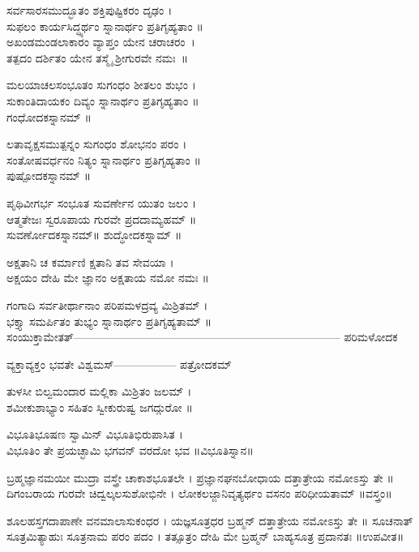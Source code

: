ಸರ್ವಸಾರಸಮುದ್ಭೂತಂ ಶಕ್ತಿಪುಷ್ಟಿಕರಂ ದೃಢಂ ।\\
ಸುಫಲಂ ಕಾರ್ಯಸಿದ್ಧ್ಯರ್ಥಂ ಸ್ನಾನಾರ್ಥಂ ಪ್ರತಿಗೃಹ್ಯತಾಂ ॥\\
ಅಖಂಡಮಂಡಲಾಕಾರಂ ವ್ಯಾಪ್ತಂ ಯೇನ ಚರಾಚರಂ~।\\
ತತ್ಪದಂ ದರ್ಶಿತಂ ಯೇನ ತಸ್ಮೈ ಶ್ರೀಗುರವೇ ನಮಃ~॥

ಮಲಯಾಚಲಸಂಭೂತಂ ಸುಗಂಧಂ ಶೀತಲಂ ಶುಭಂ ।\\
ಸುಕಾಂತಿದಾಯಕಂ ದಿವ್ಯಂ ಸ್ನಾನಾರ್ಥಂ ಪ್ರತಿಗೃಹ್ಯತಾಂ ॥\\
 ಗಂಧೋದಕಸ್ನಾನಮ್ ॥

ಲತಾವೃಕ್ಷಸಮುತ್ಪನ್ನಂ ಸುಗಂಧಂ ಶೋಭನಂ ಪರಂ ।\\
ಸಂತೋಷವರ್ಧನಂ ನಿತ್ಯಂ ಸ್ನಾನಾರ್ಥಂ ಪ್ರತಿಗೃಹ್ಯತಾಂ ॥ \\
ಪುಷ್ಪೋದಕಸ್ನಾನಮ್ ॥

ಪೃಥಿವೀಗರ್ಭ ಸಂಭೂತ ಸುವರ್ಣೇನ ಯುತಂ ಜಲಂ ।\\
ಆತ್ಮತೇಜಃ ಸ್ವರೂಪಾಯ ಗುರವೇ ಪ್ರದದಾಮ್ಯಹಮ್ ॥\\
ಸುವರ್ಣೋದಕಸ್ನಾನಮ್॥
ಶುದ್ಧೋದಕಸ್ನಾಮ್ ॥


ಅಕ್ಷತಾನಿ ಚ ಕರ್ಮಾಣಿ ಕ್ಷತಾನಿ ತವ ಸೇವಯಾ ।\\
ಅಕ್ಷಯಂ ದೇಹಿ ಮೇ ಜ್ಞಾನಂ ಅಕ್ಷತಾಯ ನಮೋ ನಮಃ ॥\\

ಗಂಗಾದಿ ಸರ್ವತೀರ್ಥಾನಾಂ ಪರಿಪಮಳದ್ರವ್ಯ ಮಿಶ್ರಿತಮ್ ।\\
ಭಕ್ತ್ಯಾ ಸಮರ್ಪಿತಂ ತುಭ್ಯಂ ಸ್ನಾನಾರ್ಥಂ ಪ್ರತಿಗೃಹ್ಯತಾಮ್ ॥\\
ಸಂಯುಕ್ತಾಮೇತತ್-----------------------------------------------------------------------
ಪರಿಮಳೋದಕ


ವ್ಯಕ್ತಾವ್ಯಕ್ತಂ ಭವತೇ ವಿಶ್ವಮಸ್-----------------
ಪತ್ರೋದಕಮ್

ತುಳಸೀ ಬಿಲ್ವಮಂದಾರ ಮಲ್ಲಿಕಾ ಮಿಶ್ರಿತಂ ಜಲಮ್ ।\\
ಶಮೀಕುಶಾಭ್ಯಾಂ ಸಹಿತಂ ಸ್ವೀಕುರುಷ್ವ ಜಗದ್ಗುರೋ ॥

ವಿಭೂತಿಭೂಷಣ ಸ್ವಾಮಿನ್ ವಿಭೂತಿಭಿರುಪಾಸಿತ ।\\
ವಿಭೂತಿಂ ತೇ ಪ್ರಯಚ್ಛಾಮಿ ಭಗವನ್ ವರದೋ ಭವ ॥ವಿಭೂತಿಸ್ನಾನ॥

ಬ್ರಹ್ಮಜ್ಞಾನಮಯೀ ಮುದ್ರಾ ವಸ್ತ್ರೇ ಚಾಕಾಶಭೂತಲೇ ।
ಪ್ರಜ್ಞಾನಘನಬೋಧಾಯ ದತ್ತಾತ್ರೇಯ ನಮೋಽಸ್ತು ತೇ ॥
ದಿಗಂಬರಾಯ ಗುರವೇ ಚಿದ್ವಲ್ಕಲಸುಶೋಭಿನೇ ।
ಲೋಕಲಜ್ಜಾನಿವೃತ್ಯರ್ಥಂ ವಸನಂ ಪರಿಧೀಯತಾಮ್ ॥ವಸ್ತ್ರಂ॥


ಶೂಲಹಸ್ತಗದಾಪಾಣೇ ವನಮಾಲಾಸುಕಂಧರ ।
ಯಜ್ಞಸೂತ್ರಧರ ಬ್ರಹ್ಮನ್ ದತ್ತಾತ್ರೇಯ ನಮೋಽಸ್ತು ತೇ ॥
ಸೂಚನಾತ್ ಸೂತ್ರಮಿತ್ಯಾಹುಃ ಸೂತ್ರನಾಮ ಪರಂ ಪದಂ ।
ತತ್ಸೂತ್ರಂ ದೇಹಿ ಮೇ ಬ್ರಹ್ಮನ್ ಬಾಹ್ಯಸೂತ್ರ ಪ್ರದಾನತಃ ॥ಉಪವೀತ॥

